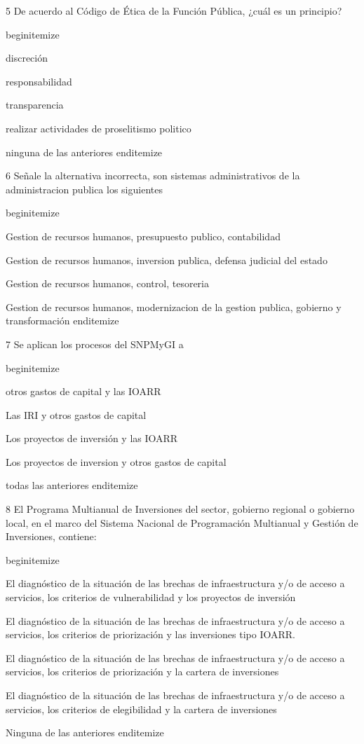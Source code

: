 5 De acuerdo al Código de Ética de la Función Pública, ¿cuál es un principio?

begin{itemize}
			\item discreción 
 			\item responsabilidad 
			\item transparencia
			\item realizar actividades de proselitismo politico
			\item ninguna de las anteriores
end{itemize}

6 Señale la alternativa incorrecta, son sistemas administrativos de la administracion publica los siguientes

begin{itemize}
			\item Gestion de recursos humanos, presupuesto publico, contabilidad
 			\item Gestion de recursos humanos, inversion publica, defensa judicial del estado
			\item Gestion de recursos humanos, control, tesoreria
			\item Gestion de recursos humanos, modernizacion de la gestion publica, gobierno y transformación 
end{itemize}

7 Se aplican los procesos del SNPMyGI a

begin{itemize}
			\item otros gastos de capital y las IOARR
 			\item Las IRI y otros gastos de capital
			\item Los proyectos de inversión y las IOARR
			\item Los proyectos de inversion y otros gastos de capital
			\item todas las anteriores 
end{itemize}

8 El Programa Multianual de Inversiones del sector, gobierno regional o gobierno local, en el marco del Sistema Nacional de Programación Multianual y Gestión de Inversiones, contiene:

begin{itemize}
			\item El diagnóstico de la situación de las brechas de infraestructura y/o de acceso a servicios, los criterios de vulnerabilidad y los proyectos de inversión
 			\item El diagnóstico de la situación de las brechas de infraestructura y/o de acceso a servicios, los criterios de priorización y las inversiones tipo IOARR.
			\item El diagnóstico de la situación de las brechas de infraestructura y/o de acceso a servicios, los criterios de priorización y la cartera de inversiones
			\item El diagnóstico de la situación de las brechas de infraestructura y/o de acceso a servicios, los criterios de elegibilidad y la cartera de inversiones
			\item Ninguna de las anteriores
end{itemize}

